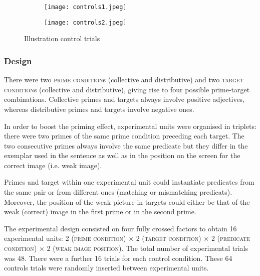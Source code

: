 \documentclass[a4paper]{article}
\newcommand{\addMM}[1]{{\leavevmode\color{red}#1}}
\begin{document}
\begin{figure}[h!]
  \centering
  \begin{subfigure}[b]{0.8\textwidth}
    \texttt{[image: controls1.jpeg]}
     \end{subfigure}
    
      \begin{subfigure}[b]{0.8\textwidth}
    \texttt{[image: controls2.jpeg]}
      \end{subfigure}
      \caption{Illustration control trials}
      \label{fig.example.controls}
\end{figure}

\subsubsection{Design}

There were two \textsc{prime condition}s (collective and distributive) and two \textsc{target condition}s (collective and distributive), giving rise to four possible prime-target combinations. Collective primes and targets always involve positive adjectives, whereas distributive primes and targets involve negative ones.

In order to boost the priming effect, experimental units were organised in triplets: there were two primes of the same prime condition preceding each target. The two consecutive primes always involve the same predicate but they differ in the exemplar used in the sentence as well as in the position on the screen for the correct image (i.e. weak image).

Primes and target within one experimental unit could instantiate predicates from the same pair or from different ones (matching or mismatching predicats). Moreover, the position of the weak picture in targets could either be that of the weak (correct) image in the first prime or in the second prime.

The experimental design consisted on four fully crossed factors to obtain 16 experimental units: 2 (\textsc{prime condition}) $\times$  2 (\textsc{target condition}) $\times$ 2 (\textsc{predicate condition}) $\times$ 2 (\textsc{weak image position}). The total number of experimental trials was 48. There were a further 16 trials for each control condition. These 64 controls trials were randomly inserted between experimental units.


\end{document}
